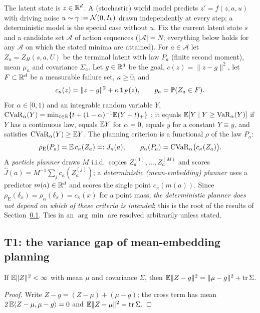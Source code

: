The latent state is $z\in\mathbb{R}^d$.
A (stochastic) world model predicts $z'=f(z,a,u)$ with driving noise $u\sim\gamma:=\mathcal{N}(0,I_k)$ drawn independently at every step;
a deterministic model is the special case without $u$.
Fix the current latent state $s$ and a candidate set $\mathcal A$ of action sequences ($|\mathcal A|=N$; everything below holds for any $\mathcal A$ on which the stated minima are attained).
For $a\in\mathcal A$ let $Z_a=Z_H(s,a,U)$ be the terminal latent with law $P_a$ (finite second moment), mean $\mu_a$ and covariance $\Sigma_a$.
Let $g\in\mathbb{R}^d$ be the goal, $c(z)=\|z-g\|^2$, let $F\subset\mathbb{R}^d$ be a measurable failure set, $\kappa\ge0$, and
\[
c_\kappa(z)=\|z-g\|^2+\kappa\,\mathbf 1_F(z),\qquad p_a=\mathbb{P}(Z_a\in F).
\]
For $\alpha\in[0,1)$ and an integrable random variable $Y$,
$\operatorname{CVaR}_\alpha(Y)=\min_{t\in\mathbb{R}}\{t+(1-\alpha)^{-1}\mathbb{E}(Y-t)_+\}$ \cite{rockafellar2000,rockafellar2002}; it equals $\mathbb{E}[Y\mid Y\ge \operatorname{VaR}_\alpha(Y)]$ if $Y$ has a continuous law, equals $\mathbb{E} Y$ for $\alpha=0$, equals $y$ for a constant $Y\equiv y$, and satisfies $\operatorname{CVaR}_\alpha(Y)\ge\mathbb{E} Y$.
The planning criterion is a functional $\rho$ of the law $P_a$:
\[
\rho_{\mathrm E}(P_a)=\mathbb{E}\,c_\kappa(Z_a)=:J_\kappa(a),\qquad
\rho_\alpha(P_a)=\operatorname{CVaR}_\alpha\bigl(c_\kappa(Z_a)\bigr).
\]
A \emph{particle planner} draws $M$ i.i.d.\ copies $Z_a^{(1)},\dots,Z_a^{(M)}$ and scores $\hat J(a)=M^{-1}\sum_j c_\kappa(Z_a^{(j)})$; a \emph{deterministic (mean-embedding) planner} uses a predictor $m(a)\in\mathbb{R}^d$ and scores the single point $c_\kappa(m(a))$.
Since $\rho_{\mathrm E}(\delta_x)=\rho_\alpha(\delta_x)=c_\kappa(x)$ for a point mass, \emph{the deterministic planner does not depend on which of these criteria is intended}; this is the root of the results of Section~\ref{sec:t1}.
Ties in an $\arg\min$ are resolved arbitrarily unless stated.

\subsection{T1: the variance gap of mean-embedding planning}\label{sec:t1}

\begin{proposition}\label{prop:bv}
If $\mathbb{E}\|Z\|^2<\infty$ with mean $\mu$ and covariance $\Sigma$, then $\mathbb{E}\|Z-g\|^2=\|\mu-g\|^2+\operatorname{tr}\Sigma$.
\end{proposition}
\begin{proof}
Write $Z-g=(Z-\mu)+(\mu-g)$; the cross term has mean $2\,\mathbb{E}\langle Z-\mu,\mu-g\rangle=0$ and $\mathbb{E}\|Z-\mu\|^2=\operatorname{tr}\Sigma$.
\end{proof}

